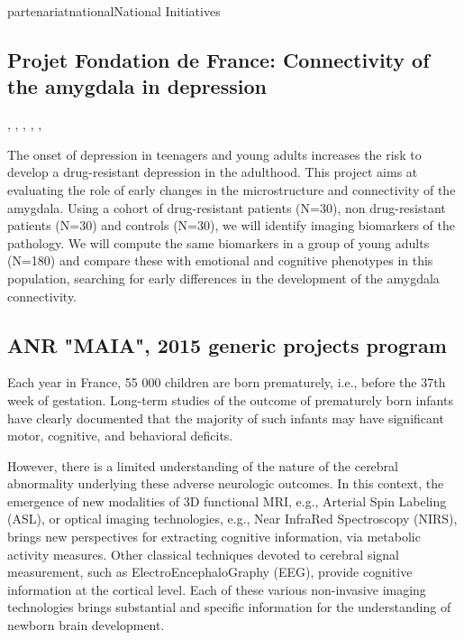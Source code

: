 \documentclass{ra2018}
\begin{document}
\begin{module}{partenariat}{national}{National Initiatives}
    \subsection{Projet Fondation de France: Connectivity of the amygdala in depression}
    \begin{participants}
      ,
      , 
      , 
      , 
      , 
    \end{participants}
    The onset of depression in teenagers and young adults increases the risk to
    develop a drug-resistant depression in the adulthood. This project aims at
    evaluating the role of early changes in the microstructure and connectivity of
    the amygdala. Using a cohort of drug-resistant patients (N=30), non
    drug-resistant patients (N=30) and controls (N=30), we will identify imaging
    biomarkers of the pathology. We will compute the same biomarkers in a group of
    young adults (N=180) and compare these with emotional and cognitive phenotypes
    in this population, searching for early differences in the development of the
    amygdala connectivity.

 
       
        \subsection{ANR "MAIA", 2015 generic projects program}
        \label{sssec:anr_maia}
        \begin{participants}
        \end{participants}
        Each year in France, 55 000 children are born prematurely, i.e., before the
        37th week of gestation. Long-term studies of the outcome of prematurely born
        infants have clearly documented that the majority of such infants may have
        significant motor, cognitive, and behavioral deficits.
        
        However, there is a limited understanding of the nature of the cerebral
        abnormality underlying these adverse neurologic outcomes.  In this context, the
        emergence of new modalities of 3D functional MRI, e.g., Arterial Spin Labeling
        (ASL), or optical imaging technologies, e.g., Near InfraRed Spectroscopy
        (NIRS), brings new perspectives for extracting cognitive information, via
        metabolic activity measures. Other classical techniques devoted to cerebral
        signal measurement, such as ElectroEncephaloGraphy (EEG), provide cognitive
        information at the cortical level. Each of these various non-invasive imaging
        technologies brings substantial and specific information for the understanding
        of newborn brain development.
        

\end{module}
\end{document}
